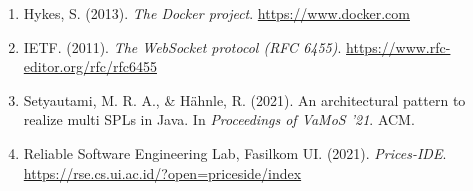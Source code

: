 \documentclass[12pt,a4paper,onecolumn]{article}
\begin{document}
\begin{enumerate}
  \item Hykes, S. (2013). \textit{The Docker project}. \url{https://www.docker.com}
  
  \item IETF. (2011). \textit{The WebSocket protocol (RFC 6455)}. \url{https://www.rfc-editor.org/rfc/rfc6455}
  
  \item Setyautami, M. R. A., \& Hähnle, R. (2021). An architectural pattern to realize multi SPLs in Java. In \textit{Proceedings of VaMoS '21}. ACM.
  
  \item Reliable Software Engineering Lab, Fasilkom UI. (2021). \textit{Prices-IDE}. \url{https://rse.cs.ui.ac.id/?open=priceside/index}
\end{enumerate}
\endgroup
\end{document}
